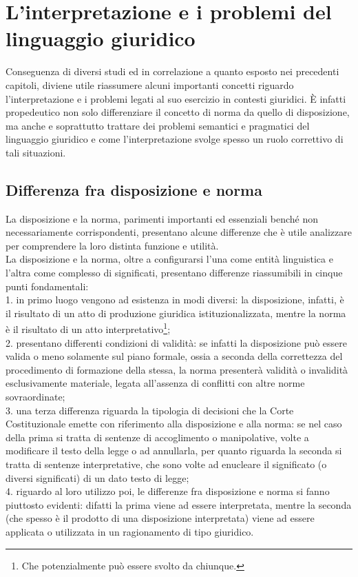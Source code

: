 \section{L'interpretazione e i problemi del linguaggio giuridico}
Conseguenza di diversi studi ed in correlazione a quanto esposto nei precedenti capitoli, diviene utile riassumere alcuni importanti concetti riguardo l'interpretazione e i problemi legati al suo esercizio in contesti giuridici.
È infatti propedeutico non solo differenziare il concetto di norma da quello di disposizione, ma anche e soprattutto trattare dei problemi semantici e pragmatici del linguaggio giuridico e come l'interpretazione svolge spesso un ruolo correttivo di tali situazioni.
\subsection{Differenza fra disposizione e norma}
La disposizione e la norma, parimenti importanti ed essenziali benché non necessariamente corrispondenti, presentano alcune differenze che è utile analizzare per comprendere la loro distinta funzione e utilità.
\\La disposizione e la norma, oltre a configurarsi l'una come entità linguistica e l'altra come complesso di significati, presentano differenze riassumibili in cinque punti fondamentali:
\\1. in primo luogo vengono ad esistenza in modi diversi: la disposizione, infatti, è il risultato di un atto di produzione giuridica istituzionalizzata, mentre la norma è il risultato di un atto interpretativo\footnote{Che potenzialmente può essere svolto da chiunque.};
\\2. presentano differenti condizioni di validità: se infatti la disposizione può essere valida o meno solamente sul piano formale, ossia a seconda della correttezza del procedimento di formazione della stessa, la norma presenterà validità o invalidità esclusivamente materiale, legata all'assenza di conflitti con altre norme sovraordinate;
\\3. una terza differenza riguarda la tipologia di decisioni che la Corte Costituzionale emette con riferimento alla disposizione e alla norma: se nel caso della prima si tratta di sentenze di accoglimento o manipolative, volte a modificare il testo della legge o ad annullarla, per quanto riguarda la seconda si tratta di sentenze interpretative, che sono volte ad enucleare il significato (o diversi significati) di un dato testo di legge;
\\4. riguardo al loro utilizzo poi, le differenze fra disposizione e norma si fanno piuttosto evidenti: difatti la prima viene ad essere interpretata, mentre la seconda (che spesso è il prodotto di una disposizione interpretata) viene ad essere applicata o utilizzata in un ragionamento di tipo giuridico.
